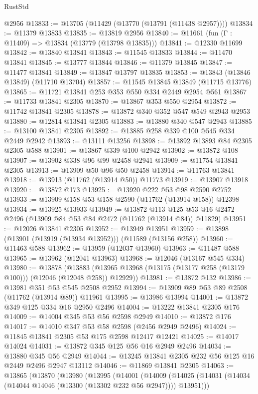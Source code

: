 \begin{lexlean}{RustStd}
\begin{coremodule}
    @2956
@13833 := @13705 (@11429 (@13770 (@13791 (@11438 @2957))))
@13834 := @11379 @13833
@13835 := @13819 @2956
@13840 := @11661 (fun (Γ : @11409) => @13834 (@13779 (@13798 @13835)))
@13841 := @12330 @11699
@13842 := @13840 @13841
@13843 := @11545 @13833
@13844 := @11470 @13841
@13845 := @13777 @13844
@13846 := @11379 @13845
@13847 := @11477 @13841
@13849 := @13847 @13797 @13835
@13853 := @13843 (@13846 @13849) (@11710 @13704)
@13857 := @11545 @13845 @13849 (@11715 @13776)
@13865 := @11721 @13841 @253 @353 @550 @334 @2449 @2954 @561
@13867 := @11733 @13841 @2305
@13870 := @13867 @353 @550 @2954
@13872 := @11742 @13841 @2305
@13878 := @13872 @340 @352 @547 @549 @2943 @2953
@13880 := @12814 @13841 @2305
@13883 := @13880 @340 @547 @2943
@13885 := @13100 @13841 @2305
@13892 := @13885 @258 @339 @100 @545 @334 @2449 @2942
@13893 := @13111 @13256
@13898 := @13892 @13893 @84 @2305 @2305 @588
@13901 := @13867 @339 @100 @2942
@13902 := @13872 @108
@13907 := @13902 @338 @96 @99 @2458 @2941
@13909 := @11754 @13841 @2305
@13913 := @13909 @50 @96 @50 @2458
@13914 := @11763 @13841
@13918 := @13913 (@11762 (@13914 @50)) @11773
@13919 := @13907 @13918
@13920 := @13872 @173
@13925 := @13920 @222 @53 @98 @2590 @2752
@13933 := @13909 @158 @53 @158 @2590 (@11762 (@13914 @158)) @12398
@13934 := @13925 @13933
@13949 := @13872
    @113
    @125
    @53
    @16
    @2472
    @2496
    (@13909 @84 @53 @84 @2472 (@11762 (@13914 @84)) @11829)
@13951 := @12026 @13841 @2305
@13952 := @13949 @13951
@13959 := @13898 (@13901 (@13919 (@13934 @13952))) (@11589 (@13156 @258))
@13960 := @11463 @588
@13962 := @13959 (@12037 @13960)
@13963 := @11487 @588
@13965 := @13962 (@12041 @13963)
@13968 := @12046 (@13167 @545 @334)
@13980 := @13878
    (@13883 (@13965 @13968 (@13175 (@13177 @258 (@13179 @100))) (@12046 (@12048 @258)) @12929))
@13981 := @13872 @132
@13986 := @13981 @351 @53 @545 @2508 @2952
@13994 := @13909 @89 @53 @89 @2508 (@11762 (@13914 @89)) @11961
@13995 := @13986 @13994
@14001 := @13872 @349 @125 @334 @16 @2950 @2496
@14004 := @13222 @13841 @2305 @176
@14009 := @14004 @345 @53 @56 @2598 @2949
@14010 := @13872 @176
@14017 := @14010 @347 @53 @58 @2598 (@2456 @2949 @2496)
@14024 := @11845 @13841 @2305 @53 @175 @2598 @12417 @12421
@14025 := @14017 @14024
@14031 := @13872 @345 @125 @56 @16 @2949 @2496
@14034 := @13880 @345 @56 @2949
@14044 := @13245 @13841 @2305 @232 @56 @125 @16 @2449 @2496 @2947 @13112
@14046 := @11869 @13841 @2305
@14063 := @13865
    (@13870
      (@13980
        (@13995
          (@14001
            (@14009
              (@14025 (@14031 (@14034 (@14044 @14046 (@13300 (@13302 @232 @56 @2947)))) @13951)))

\end{coremodule}
\end{lexlean}
